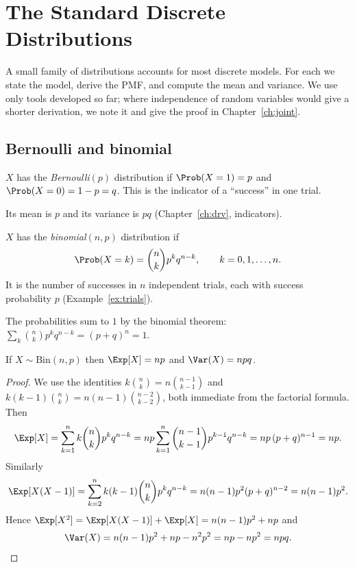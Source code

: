 \chapter{The Standard Discrete Distributions}
\label{ch:dist}

A small family of distributions accounts for most discrete models. For each we
state the model, derive the PMF, and compute the mean and variance. We use only
tools developed so far; where independence of random variables would give a
shorter derivation, we note it and give the proof in Chapter~\ref{ch:joint}.

\section{Bernoulli and binomial}

\begin{definition}[Bernoulli]
$X$ has the \emph{Bernoulli}$(p)$ distribution if $\Prob(X=1)=p$ and
$\Prob(X=0)=1-p=q$. This is the indicator of a ``success'' in one trial.
\end{definition}

Its mean is $p$ and its variance is $pq$ (Chapter~\ref{ch:drv}, indicators).

\begin{definition}[Binomial]
$X$ has the \emph{binomial}$(n,p)$ distribution if
\[
\Prob(X=k)=\binom nkp^kq^{n-k},\qquad k=0,1,\dots,n .
\]
It is the number of successes in $n$ independent trials, each with success
probability $p$ (Example~\ref{ex:trials}).
\end{definition}

The probabilities sum to $1$ by the binomial theorem:
$\sum_k\binom nkp^kq^{n-k}=(p+q)^n=1$.

\begin{theorem}\label{thm:binmoments}
If $X\sim\mathrm{Bin}(n,p)$ then $\Exp[X]=np$ and $\Var(X)=npq$.
\end{theorem}
\begin{proof}
We use the identities $k\binom nk=n\binom{n-1}{k-1}$ and
$k(k-1)\binom nk=n(n-1)\binom{n-2}{k-2}$, both immediate from the factorial
formula. Then
\[
\Exp[X]=\sum_{k=1}^nk\binom nkp^kq^{n-k}=np\sum_{k=1}^n\binom{n-1}{k-1}p^{k-1}q^{n-k}
=np\,(p+q)^{n-1}=np.
\]
Similarly
\[
\Exp[X(X-1)]=\sum_{k=2}^nk(k-1)\binom nkp^kq^{n-k}=n(n-1)p^2(p+q)^{n-2}=n(n-1)p^2.
\]
Hence $\Exp[X^2]=\Exp[X(X-1)]+\Exp[X]=n(n-1)p^2+np$ and
\[
\Var(X)=n(n-1)p^2+np-n^2p^2=np-np^2=npq.\qedhere
\]
\end{proof}

